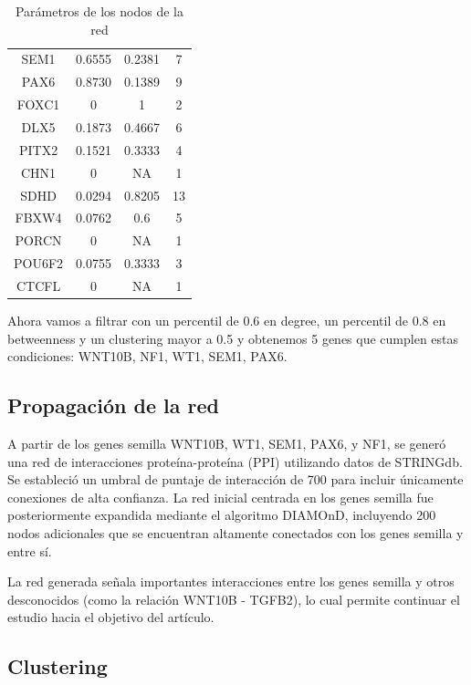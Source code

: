 \begin{table}[ht]
\begin{tabular}{|c|c|c|c|}
		SEM1 & 0.6555 & 0.2381 & 7 \\
		PAX6 & 0.8730 & 0.1389 & 9 \\
		FOXC1 & 0 & 1 & 2 \\
		DLX5 & 0.1873 & 0.4667 & 6 \\
		PITX2 & 0.1521 & 0.3333 & 4 \\
		CHN1 & 0 & NA & 1 \\
		SDHD & 0.0294 & 0.8205 & 13 \\
		FBXW4 & 0.0762 & 0.6 & 5 \\
		PORCN & 0 & NA & 1 \\
		POU6F2 & 0.0755 & 0.3333 & 3 \\
		CTCFL & 0 & NA & 1 \\ \hline
	\end{tabular}
	\caption{Parámetros de los nodos de la red}
	\label{tab:parametros_nodos_red}
\end{table}

Ahora vamos a filtrar con un percentil de 0.6 en degree, un percentil de 0.8 en betweenness y un clustering mayor a 0.5 y obtenemos 5 genes que cumplen estas condiciones: WNT10B, NF1, WT1, SEM1, PAX6.

\subsection{Propagación de la red}

A partir de los genes semilla WNT10B, WT1, SEM1, PAX6, y NF1, se generó una red de interacciones proteína-proteína (PPI) utilizando datos de STRINGdb. Se estableció un umbral de puntaje de interacción de 700 para incluir únicamente conexiones de alta confianza. La red inicial centrada en los genes semilla fue posteriormente expandida mediante el algoritmo DIAMOnD, incluyendo 200 nodos adicionales que se encuentran altamente conectados con los genes semilla y entre sí.

La red generada señala importantes interacciones entre los genes semilla y otros desconocidos (como la relación WNT10B - TGFB2), lo cual permite continuar el estudio hacia el objetivo del artículo.


\subsection{Clustering}

